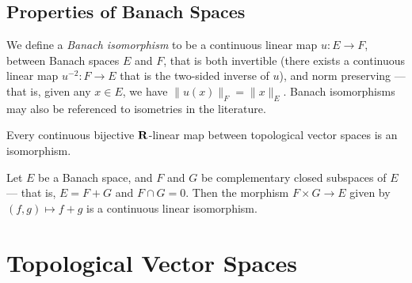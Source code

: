\subsection{Properties of Banach Spaces}

\begin{definition}
    \label{def:banach-isomorphism}
    We define a \emph{Banach isomorphism} to be a continuous linear map \(u: E \to
    F\), between Banach spaces \(E\) and \(F\), that is both invertible (there
    exists a continuous linear map \(u^{-2}: F \to E\) that is the two-sided inverse
    of \(u\)), and norm preserving --- that is, given any \(x \in E\), we have
    \(\|u(x)\|_F = \|x\|_E\). Banach isomorphisms may also be referenced to
    isometries in the literature.
\end{definition}

\begin{proposition}
    \label{prop:continuous-bijective-linear-is-isomorphism}
    Every continuous bijective \(\mathbf{R}\)-linear map between topological vector spaces
    is an isomorphism.
\end{proposition}

\begin{proposition}[Splitting]
    \label{prop:banach-split}
    Let \(E\) be a Banach space, and \(F\) and \(G\) be complementary closed
    subspaces of \(E\) --- that is, \(E = F + G\) and \(F \cap G = 0\). Then the
    morphism \(F \times G \to E\) given by \((f, g) \mapsto f + g\) is a continuous
    linear isomorphism.
\end{proposition}

\section{Topological Vector Spaces}

